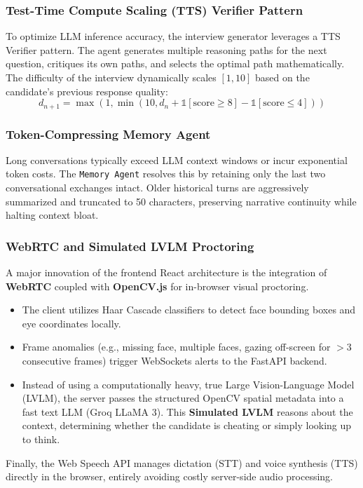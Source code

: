 \subsubsection{Test-Time Compute Scaling (TTS) Verifier Pattern}
To optimize LLM inference accuracy, the interview generator leverages a TTS Verifier pattern. The agent generates multiple reasoning paths for the next question, critiques its own paths, and selects the optimal path mathematically. 
The difficulty of the interview dynamically scales $[1, 10]$ based on the candidate's previous response quality:
\begin{equation}
    d_{n+1} = \max\left(1, \min\left(10, d_n + \mathbb{1}[\text{score} \geq 8] - \mathbb{1}[\text{score} \leq 4]\right)\right)
\end{equation}

\subsubsection{Token-Compressing Memory Agent}
Long conversations typically exceed LLM context windows or incur exponential token costs. The \texttt{Memory Agent} resolves this by retaining only the last two conversational exchanges intact. Older historical turns are aggressively summarized and truncated to 50 characters, preserving narrative continuity while halting context bloat.

\subsubsection{WebRTC and Simulated LVLM Proctoring}
A major innovation of the frontend React architecture is the integration of \textbf{WebRTC} coupled with \textbf{OpenCV.js} for in-browser visual proctoring.
\begin{itemize}
    \item The client utilizes Haar Cascade classifiers to detect face bounding boxes and eye coordinates locally.
    \item Frame anomalies (e.g., missing face, multiple faces, gazing off-screen for $>3$ consecutive frames) trigger WebSockets alerts to the FastAPI backend.
    \item Instead of using a computationally heavy, true Large Vision-Language Model (LVLM), the server passes the structured OpenCV spatial metadata into a fast text LLM (Groq LLaMA 3). This \textbf{Simulated LVLM} reasons about the context, determining whether the candidate is cheating or simply looking up to think.
\end{itemize}
Finally, the Web Speech API manages dictation (STT) and voice synthesis (TTS) directly in the browser, entirely avoiding costly server-side audio processing.
